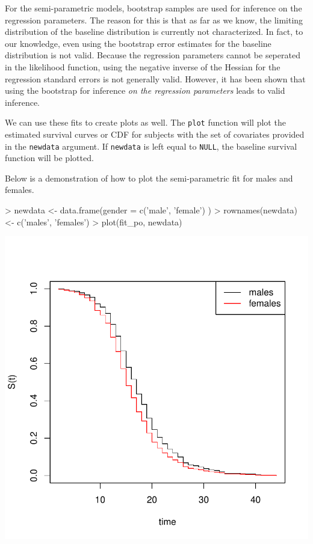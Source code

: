 \documentclass[a4paper]{article}
\begin{document}
For the semi-parametric models, bootstrap samples are used for inference on the regression parameters. The reason for this is that as far as we know, the limiting distribution of the baseline distribution is currently not characterized. In fact, to our knowledge, even using the bootstrap error estimates for the baseline distribution is not valid. Because the regression parameters cannot be seperated in the likelihood function, using the negative inverse of the Hessian for the regression standard errors is not generally valid. However, it has been shown that using the bootstrap for inference \emph{on the regression parameters} leads to valid inference. 

We can use these fits to create plots as well. The \texttt{plot} function will plot the estimated survival curves or CDF for subjects with the set of covariates provided in the \texttt{newdata} argument. If \texttt{newdata} is left equal to \texttt{NULL}, the baseline survival function will be plotted. 
  
Below is a demonstration of how to plot the semi-parametric fit for males and females.
  
\begin{Schunk}
\begin{Sinput}
>   newdata <- data.frame(gender = c('male', 'female') )
>   rownames(newdata) <- c('males', 'females')
>   plot(fit_po, newdata)
\end{Sinput}
\end{Schunk}
\includegraphics{icenReg-009}
\end{document}
